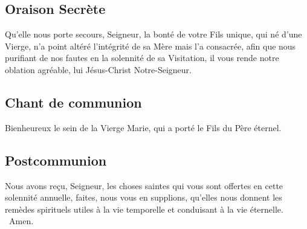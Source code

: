 \begin{multicols}{2}
\subsection*{Oraison Secrète}
Qu’elle nous porte secours, Seigneur, la bonté de votre Fils unique, qui né d’une Vierge, n’a point altéré l’intégrité de sa Mère mais l’a consacrée, afin que nous purifiant de nos fautes en la solennité de sa Visitation, il vous rende notre oblation agréable, lui Jésus-Christ Notre-Seigneur.

\subsection*{Chant de communion}
Bienheureux le sein de la Vierge Marie, qui a porté le Fils du Père éternel.

\subsection*{Postcommunion}
{Nous avons reçu, Seigneur, les choses saintes qui vous sont offertes en cette solennité annuelle, faites, nous vous en supplions, qu’elles nous donnent les remèdes spirituels utiles à la vie temporelle et conduisant à la vie éternelle.}
{\textbf \rb\ Amen.}

\end{multicols}